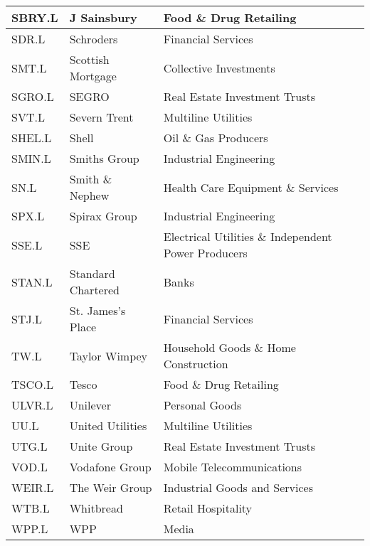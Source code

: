 \begin{longtable}{|p{2cm}|p{4cm}|p{6cm}|}
SBRY.L & J Sainsbury & Food \& Drug Retailing \\ \hline
SDR.L & Schroders & Financial Services \\ \hline
SMT.L & Scottish Mortgage & Collective Investments \\ \hline
SGRO.L & SEGRO & Real Estate Investment Trusts \\ \hline
SVT.L & Severn Trent & Multiline Utilities \\ \hline
SHEL.L & Shell & Oil \& Gas Producers \\ \hline
SMIN.L & Smiths Group & Industrial Engineering \\ \hline
SN.L & Smith \& Nephew & Health Care Equipment \& Services \\ \hline
SPX.L & Spirax Group & Industrial Engineering \\ \hline
SSE.L & SSE & Electrical Utilities \& Independent Power Producers \\ \hline
STAN.L & Standard Chartered & Banks \\ \hline
STJ.L & St. James's Place & Financial Services \\ \hline
TW.L & Taylor Wimpey & Household Goods \& Home Construction \\ \hline
TSCO.L & Tesco & Food \& Drug Retailing \\ \hline
ULVR.L & Unilever & Personal Goods \\ \hline
UU.L & United Utilities &  Multiline Utilities \\ \hline
UTG.L & Unite Group & Real Estate Investment Trusts \\ \hline
VOD.L & Vodafone Group & Mobile Telecommunications \\ \hline
WEIR.L & The Weir Group & Industrial Goods and Services \\ \hline
WTB.L & Whitbread & Retail Hospitality \\ \hline
WPP.L & WPP & Media \\ \hline
\end{longtable}
